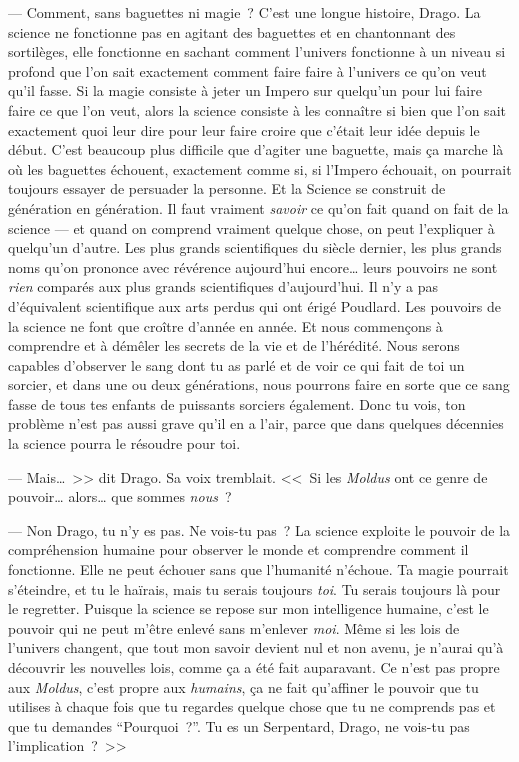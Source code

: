 --- Comment, sans baguettes ni magie~? C'est une longue histoire, Drago. La science ne fonctionne pas en agitant des baguettes et en chantonnant des sortilèges, elle fonctionne en sachant comment l'univers fonctionne à un niveau si profond que l'on sait exactement comment faire faire à l'univers ce qu'on veut qu'il fasse. Si la magie consiste à jeter un Impero sur quelqu'un pour lui faire faire ce que l'on veut, alors la science consiste à les connaître si bien que l'on sait exactement quoi leur dire pour leur faire croire que c'était leur idée depuis le début. C'est beaucoup plus difficile que d'agiter une baguette, mais ça marche là où les baguettes échouent, exactement comme si, si l'Impero échouait, on pourrait toujours essayer de persuader la personne. Et la Science se construit de génération en génération. Il faut vraiment \emph{savoir} ce qu'on fait quand on fait de la science — et quand on comprend vraiment quelque chose, on peut l'expliquer à quelqu'un d'autre. Les plus grands scientifiques du siècle dernier, les plus grands noms qu'on prononce avec révérence aujourd'hui encore… leurs pouvoirs ne sont \emph{rien} comparés aux plus grands scientifiques d'aujourd'hui. Il n'y a pas d'équivalent scientifique aux arts perdus qui ont érigé Poudlard. Les pouvoirs de la science ne font que croître d'année en année. Et nous commençons à comprendre et à démêler les secrets de la vie et de l'hérédité. Nous serons capables d'observer le sang dont tu as parlé et de voir ce qui fait de toi un sorcier, et dans une ou deux générations, nous pourrons faire en sorte que ce sang fasse de tous tes enfants de puissants sorciers également. Donc tu vois, ton problème n'est pas aussi grave qu'il en a l'air, parce que dans quelques décennies la science pourra le résoudre pour toi.

--- Mais…~>> dit Drago. Sa voix tremblait. <<~Si les \emph{Moldus} ont ce genre de pouvoir… alors… que sommes \emph{nous}~?

--- Non Drago, tu n'y es pas. Ne vois-tu pas~? La science exploite le pouvoir de la compréhension humaine pour observer le monde et comprendre comment il fonctionne. Elle ne peut échouer sans que l'humanité n'échoue. Ta magie pourrait s'éteindre, et tu le haïrais, mais tu serais toujours \emph{toi}. Tu serais toujours là pour le regretter. Puisque la science se repose sur mon intelligence humaine, c'est le pouvoir qui ne peut m'être enlevé sans m'enlever \emph{moi}. Même si les lois de l'univers changent, que tout mon savoir devient nul et non avenu, je n'aurai qu'à découvrir les nouvelles lois, comme ça a été fait auparavant. Ce n'est pas propre aux \emph{Moldus}, c'est propre aux \emph{humains}, ça ne fait qu'affiner le pouvoir que tu utilises à chaque fois que tu regardes quelque chose que tu ne comprends pas et que tu demandes “Pourquoi~?”. Tu es un Serpentard, Drago, ne vois-tu pas l'implication~?~>>

